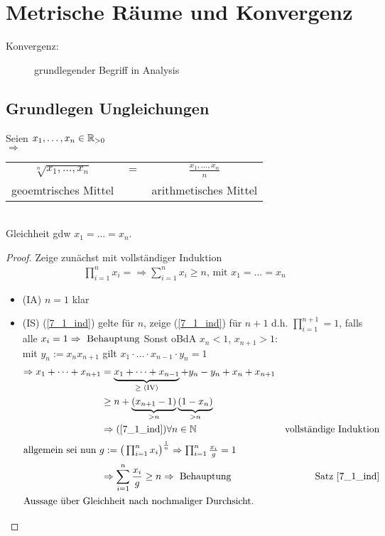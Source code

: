 \part{Metrische Räume und Konvergenz}
\begin{description}
	\item[Konvergenz:] grundlegender Begriff in Analysis %
\end{description}
\chapter{Grundlegen Ungleichungen}

\begin{satz}\label{satz_7_1_geo_mittel}
	Seien $x_1, \dots, x_n \in \mathbb{R}_{>0}$\\
$\Rightarrow$
	\begin{tabular}{ccc}
		$ \sqrt[n]{x_1, \dots, x_n}$ & $=$ & $\frac{x_1, \dots, x_n}{n}$ \\
		geoemtrisches Mittel &  & arithmetisches Mittel \\
	\end{tabular}\\
Gleichheit gdw $x_1 = \dots = x_n$.
\end{satz}

\begin{proof}
	Zeige zunächst mit vollständiger Induktion\\
	\begin{align} %
	\prod_{i=1}^{n}x_i= \Rightarrow \sum_{i=1}^{n} x_i \geq n \text{, mit } x_1=\dots=x_n \label{7_1_ind}
	\end{align}
	\begin{itemize}
		\item (IA) $n = 1$ klar
	    \item (IS) (\ref{7_1_ind}) gelte für $n$, zeige (\ref{7_1_ind}) für $n+1$ d.h. $\prod_{i=1}^{n+1} = 1$, falls alle $x_i=1 \Rightarrow \text{ Behauptung}$ Sonst oBdA $x_n < 1$, $x_{n+1} > 1:$\\ mit $y_n:=x_n x_{n+1}$ gilt $x_1\cdot\dots\cdot x_{n-1}\cdot y_n=1$
	    \begin{align*}
	        \Rightarrow x_1 + \dots + x_{n+1} &= \underbrace{x_1+\dots+x_{n-1}}_{\geq \text{ (IV)}} + y_n - y_n + x_n+x_{n+1}\\ 
            &\geq n + \underbrace{(x_{n+1} -1)}_{>n}\underbrace{(1-x_n)}_{>n}\\ 
            &\Rightarrow (\ref{7_1_ind}) \forall n \in \mathbb{N}& \text{vollständige Induktion}\\ 
            \shortintertext{allgemein sei nun $g:=\big( \prod_{i=1}^{n} x_i \big)^{\frac{1}{n}} \Rightarrow \prod_{i=1}^{n} \frac{x_i}{g} = 1$}
            &\Rightarrow \sum_{i=1}^{n} \frac{x_i}{g} \geq n \Rightarrow \text{ Behauptung}& \text{Satz \ref{7_1_ind}}\\ 
            \shortintertext{Aussage über Gleichheit nach nochmaliger Durchsicht.}
	    \end{align*}
	\end{itemize} 
	\QEDA
\end{proof}

